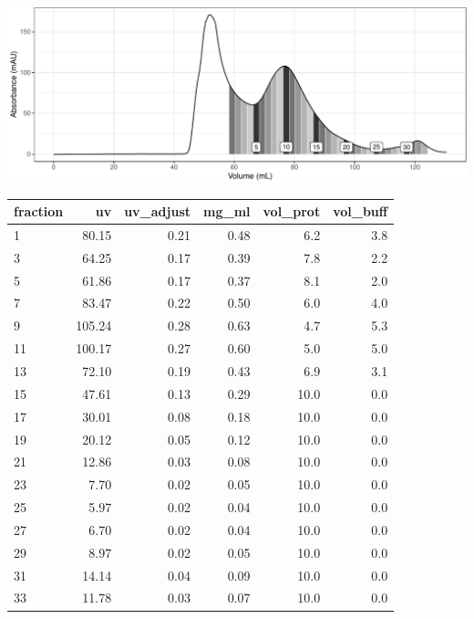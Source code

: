 \documentclass[
  letterpaper,
  DIV=11,
  numbers=noendperiod]{scrartcl}
\begin{document}
\includegraphics{dsnppr10-purification_files/figure-pdf/unnamed-chunk-5-1.pdf}

\begin{longtable}[]{@{}lrrrrr@{}}
\toprule()
fraction & uv & uv\_adjust & mg\_ml & vol\_prot & vol\_buff \\
\midrule()
\endhead
1 & 80.15 & 0.21 & 0.48 & 6.2 & 3.8 \\
3 & 64.25 & 0.17 & 0.39 & 7.8 & 2.2 \\
5 & 61.86 & 0.17 & 0.37 & 8.1 & 2.0 \\
7 & 83.47 & 0.22 & 0.50 & 6.0 & 4.0 \\
9 & 105.24 & 0.28 & 0.63 & 4.7 & 5.3 \\
11 & 100.17 & 0.27 & 0.60 & 5.0 & 5.0 \\
13 & 72.10 & 0.19 & 0.43 & 6.9 & 3.1 \\
15 & 47.61 & 0.13 & 0.29 & 10.0 & 0.0 \\
17 & 30.01 & 0.08 & 0.18 & 10.0 & 0.0 \\
19 & 20.12 & 0.05 & 0.12 & 10.0 & 0.0 \\
21 & 12.86 & 0.03 & 0.08 & 10.0 & 0.0 \\
23 & 7.70 & 0.02 & 0.05 & 10.0 & 0.0 \\
25 & 5.97 & 0.02 & 0.04 & 10.0 & 0.0 \\
27 & 6.70 & 0.02 & 0.04 & 10.0 & 0.0 \\
29 & 8.97 & 0.02 & 0.05 & 10.0 & 0.0 \\
31 & 14.14 & 0.04 & 0.09 & 10.0 & 0.0 \\
33 & 11.78 & 0.03 & 0.07 & 10.0 & 0.0 \\
\bottomrule()
\end{longtable}
\end{document}
